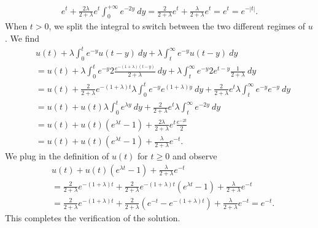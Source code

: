 \documentclass[11pt]{article}
\begin{document}
\begin{solution}
\begin{align}
        e^{t}
        + 
        \frac{ 2 \lambda }{2+\lambda}
        e^{t}
        \int_{0}^{+\infty} e^{-2y} \ dy 
        = 
        \frac{2}{2 + \lambda}
        e^{t}
        +
        \frac{\lambda}{2 + \lambda}
        e^{t}
        = 
        e^{t}
        =
        e^{-|t|}
        .
    \end{align}
    When $t > 0$, we split the integral to switch between the two different regimes of $u$. We find 
    \begin{align*}
        &
        u(t)
        +
        \lambda \int_{0}^{t} e^{-y} u(t-y) \ dy
        +
        \lambda \int_{t}^{\infty} e^{-y} u(t-y) \ dy
        \\&
        =
        u(t)
        +
        \lambda \int_{0}^{t} e^{-y} 
        2 \frac{ e^{-(1+\lambda) (t-y)}  }{ 2+\lambda }
        \ dy
        +
        \lambda \int_{t}^{\infty} e^{-y} 
        2 e^{t-y} \frac{1}{2+\lambda}
        \ dy
        \\&
        =
        u(t)
        +
        \frac{2}{2+\lambda}
        e^{-(1+\lambda)t}
        \lambda \int_{0}^{t} e^{-y} 
        e^{(1+\lambda)y}
        \ dy
        +
        \frac{2}{2+\lambda}
        e^{t}
        \lambda \int_{t}^{\infty} e^{-y} 
        e^{-y}
        \ dy
        \\&
        =
        u(t)
        +
        u(t)
        \lambda \int_{0}^{t} e^{ \lambda y}
        \ dy
        +
        \frac{2}{2+\lambda}
        e^{t}
        \lambda \int_{t}^{\infty} e^{-2y} \ dy
        \\&
        =
        u(t)
        +
        u(t)
        \left( e^{\lambda t}-1 \right)
        +
        \frac{2\lambda}{2+\lambda}
        e^{t}
        \frac{e^{-2t}}{2}
        \\&
        =
        u(t)
        +
        u(t)
        \left( e^{\lambda t}-1 \right)
        +
        \frac{\lambda }{2+\lambda} e^{-t}
        .
    \end{align*}
    We plug in the definition of $u(t)$ for $t \geq 0$ and observe 
    \begin{align*}
        &
        u(t)
        +
        u(t)
        \left( e^{\lambda t}-1 \right)
        +
        \frac{\lambda }{2+\lambda} e^{-t}
        \\&
        =
        \frac{ 2 }{ 2+\lambda } e^{-(1+\lambda) t}
        +
        \frac{ 2 }{ 2+\lambda } e^{-(1+\lambda) t}
        \left( e^{\lambda t}-1 \right)
        +
        \frac{\lambda }{2+\lambda} e^{-t}
        \\&
        =
        \frac{ 2 }{ 2+\lambda } e^{-(1+\lambda) t}
        +
        \frac{ 2 }{ 2+\lambda } 
        \left( e^{-t} - e^{-(1+\lambda) t} \right)
        +
        \frac{\lambda }{2+\lambda} e^{-t}
        =
        e^{-t}
        .
    \end{align*}
    This completes the verification of the solution.
\end{solution}
\end{document}
